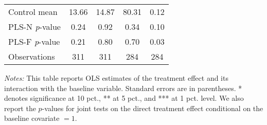 \begin{table}[ht]
{\begin{threeparttable}
\begin{tabular}{l*{4}{c}}
Control mean    &    13.66         &    14.87         &    80.31         &     0.12         \\
PLS-N \emph{p}-value&     0.24         &     0.92         &     0.34         &     0.10         \\
PLS-F \emph{p}-value&     0.21         &     0.80         &     0.70         &     0.03         \\
Observations    &      311         &      311         &      284         &      284         \\
\bottomrule \end{tabular} \begin{tablenotes}[flushleft] \footnotesize \item \emph{Notes:} This table reports OLS estimates of the treatment effect and its interaction with the baseline variable. Standard errors are in parentheses. * denotes significance at 10 pct., ** at 5 pct., and *** at 1 pct. level. We also report the \(p\)-values for joint tests on the direct treatment effect conditional on the baseline covariate $= 1$. \end{tablenotes} \end{threeparttable} } \end{table}

